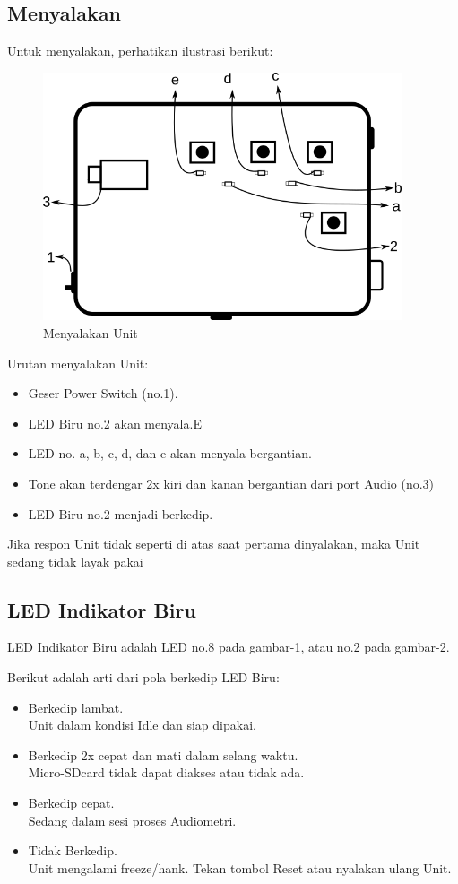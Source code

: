 \documentclass[12pt,]{article}
\begin{document}
	\subsection{Menyalakan}
	
	Untuk menyalakan, perhatikan ilustrasi berikut:
	
	\begin{figure}[!ht]
		\centering
		\includegraphics[width=300pt]{images/turnon}
		\caption{Menyalakan Unit}
	\end{figure}
	
	\newpage
	Urutan menyalakan Unit:
	\begin{itemize}
		\item Geser Power Switch (no.1).
		\item LED Biru no.2 akan menyala.E
		\item LED no. a, b, c, d, dan e akan menyala bergantian.
		\item Tone akan terdengar 2x kiri dan kanan bergantian dari port Audio (no.3)
		\item LED Biru no.2 menjadi berkedip.
	\end{itemize}

	Jika respon Unit tidak seperti di atas saat pertama dinyalakan, maka Unit sedang tidak layak pakai
	
	\subsection{LED Indikator Biru}
	
	LED Indikator Biru adalah LED no.8 pada gambar-1, atau no.2 pada gambar-2.
	
	Berikut adalah arti dari pola berkedip LED Biru:
	\begin{itemize}
		\item Berkedip lambat.\\
		Unit dalam kondisi Idle dan siap dipakai.
		
		\item Berkedip 2x cepat dan mati dalam selang waktu.\\
		Micro-SDcard tidak dapat diakses atau tidak ada.
		
		\item Berkedip cepat.\\
		Sedang dalam sesi proses Audiometri.
		
		\item Tidak Berkedip.\\
		Unit mengalami freeze/hank. Tekan tombol Reset atau nyalakan ulang Unit.
	\end{itemize}
	
\end{document}
